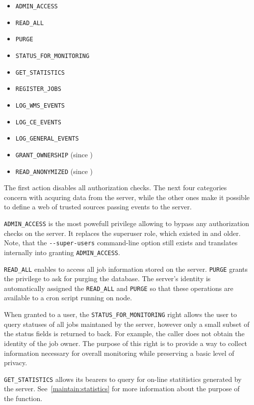 \begin{itemize}
\item \verb'ADMIN_ACCESS'
\item \verb'READ_ALL'
\item \verb'PURGE'
\item \verb'STATUS_FOR_MONITORING'
\item \verb'GET_STATISTICS'
\item \verb'REGISTER_JOBS'
\item \verb'LOG_WMS_EVENTS'
\item \verb'LOG_CE_EVENTS'
\item \verb'LOG_GENERAL_EVENTS'
\item \verb'GRANT_OWNERSHIP' (since )
\item \verb'READ_ANONYMIZED' (since )
\end{itemize}

The first action disables all authorization checks. The next four categories concern with acquring data from the \LB
server, while the other ones make it possible to define a web of trusted sources
passing events to the \LB server.

\verb'ADMIN_ACCESS' is the most powefull privilege allowing to bypass any
authorization checks on the server. It replaces the superuser role, which
existed in  and older. Note, that the \verb'--super-users'
command-line option still exists and translates internally into granting
\verb'ADMIN_ACCESS'.

\verb'READ_ALL' enables to access all job information stored on the server.
\verb'PURGE' grants the privilege to ask for purging the \LB database.  The \LB
server's identity is automatically assigned the \verb'READ_ALL' and
\verb'PURGE' so that these operations are available \eg to a cron script
running on \LB node.

When granted to a user, the \verb'STATUS_FOR_MONITORING' right allows the user to
query statuses of all jobs maintaned by the server, however only a small
subset of the status fields is returned to back. For example, the caller
does not obtain the identity of the job owner. The purpose of this right is
to provide a way to collect information necessary for overall monitoring
while preserving a basic level of privacy.

\verb'GET_STATISTICS' allows its bearers to query for on-line statitistics
generated by the \LB server. See~\ref{maintain:statistics} for more
information about the purpose of the function.


